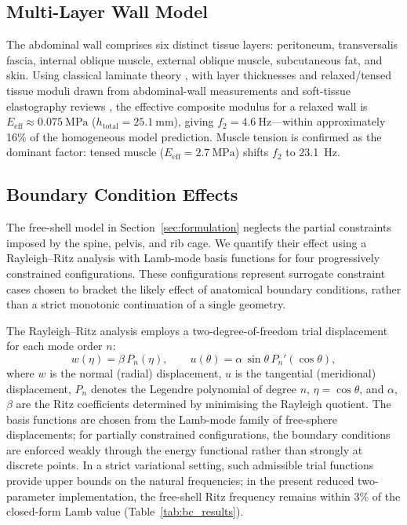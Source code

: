 \subsection{Multi-Layer Wall Model}

The abdominal wall comprises six distinct tissue layers:
peritoneum, transversalis fascia, internal oblique muscle, external oblique
muscle, subcutaneous fat, and skin.  Using classical laminate theory
\cite{Jones1999}, with layer thicknesses and relaxed/tensed tissue moduli
drawn from abdominal-wall measurements and soft-tissue elastography reviews
\cite{Deeken2017,Spadoni2024,Sack2023}, the effective composite modulus for a
relaxed wall is
$E_\mathrm{eff} \approx \SI{0.075}{\mega\pascal}$
($h_\mathrm{total} = \SI{25.1}{\milli\metre}$), giving
$f_2 = \SI{4.6}{\hertz}$---within approximately 16\% of the homogeneous model
prediction.
Muscle tension is confirmed as the dominant factor: tensed muscle
($E_\mathrm{eff} = \SI{2.7}{\mega\pascal}$) shifts $f_2$ to
\SI{23.1}{\hertz}.

\subsection{Boundary Condition Effects}
\label{sec:bc_effects}

The free-shell model in Section~\ref{sec:formulation} neglects the partial
constraints imposed by the spine, pelvis, and rib cage.  We quantify their
effect using a Rayleigh--Ritz analysis with Lamb-mode basis functions for
four progressively constrained configurations.
These configurations represent surrogate constraint cases chosen to bracket
the likely effect of anatomical boundary conditions, rather than a strict
monotonic continuation of a single geometry.

The Rayleigh--Ritz analysis employs a two-degree-of-freedom trial displacement
for each mode order $n$:
\begin{equation}
  w(\eta) = \beta\, P_n(\eta), \qquad
  u(\theta) = \alpha\, \sin\theta\, P_n'(\cos\theta),
\end{equation}
where $w$ is the normal (radial) displacement, $u$ is the tangential
(meridional) displacement, $P_n$ denotes the Legendre polynomial of degree
$n$, $\eta = \cos\theta$, and $\alpha$, $\beta$ are the Ritz coefficients
determined by minimising the Rayleigh quotient.  The basis functions are
chosen from the Lamb-mode family of free-sphere displacements; for partially
constrained configurations, the boundary conditions are enforced weakly through
the energy functional rather than strongly at discrete points.  In a strict
variational setting, such admissible trial functions provide upper bounds on
the natural frequencies; in the present reduced two-parameter implementation,
the free-shell Ritz frequency remains within 3\% of the closed-form Lamb value
(Table~\ref{tab:bc_results}).

